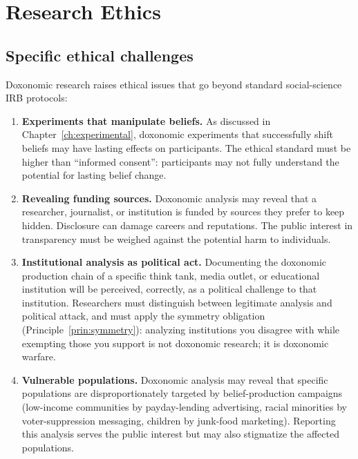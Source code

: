 \section{Research Ethics}
\label{sec:ch34-research}

\subsection{Specific ethical challenges}

Doxonomic research raises ethical issues that go beyond standard social-science IRB protocols:

\begin{enumerate}
  \item \textbf{Experiments that manipulate beliefs.}
  As discussed in Chapter~\ref{ch:experimental}, doxonomic experiments that successfully shift beliefs may have lasting effects on participants.
  The ethical standard must be higher than ``informed consent'': participants may not fully understand the potential for lasting belief change.

  \item \textbf{Revealing funding sources.}
  Doxonomic analysis may reveal that a researcher, journalist, or institution is funded by sources they prefer to keep hidden.
  Disclosure can damage careers and reputations.
  The public interest in transparency must be weighed against the potential harm to individuals.

  \item \textbf{Institutional analysis as political act.}
  Documenting the doxonomic production chain of a specific think tank, media outlet, or educational institution will be perceived, correctly, as a political challenge to that institution.
  Researchers must distinguish between legitimate analysis and political attack, and must apply the symmetry obligation (Principle~\ref{prin:symmetry}): analyzing institutions you disagree with while exempting those you support is not doxonomic research; it is doxonomic warfare.

  \item \textbf{Vulnerable populations.}
  Doxonomic analysis may reveal that specific populations are disproportionately targeted by belief-production campaigns (low-income communities by payday-lending advertising, racial minorities by voter-suppression messaging, children by junk-food marketing).
  Reporting this analysis serves the public interest but may also stigmatize the affected populations.
\end{enumerate}

